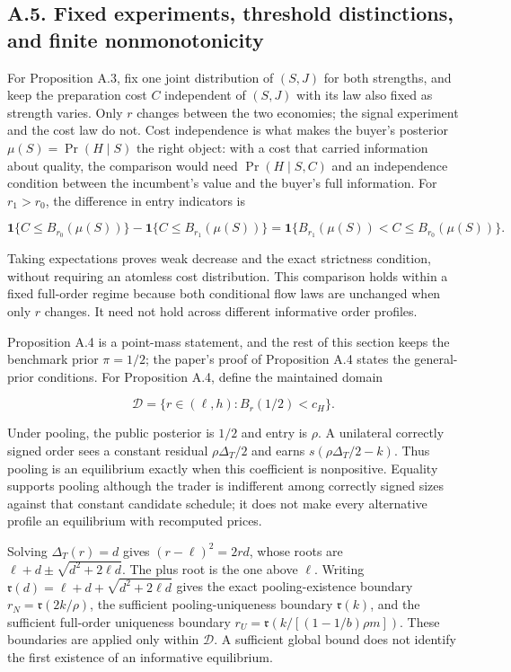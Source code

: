\documentclass[
  11pt,
]{article}
\begin{document}
\subsection{A.5. Fixed experiments, threshold distinctions, and finite
nonmonotonicity}\label{oa-a-thresholds}

For Proposition A.3, fix one joint distribution of \((S,J)\) for
both strengths, and keep the preparation cost \(C\) independent of
\((S,J)\) with its law also fixed as strength varies. Only \(r\)
changes between the two economies; the signal experiment and the cost
law do not. Cost independence is what makes the buyer's posterior
\(\mu(S)=\Pr(H\mid S)\) the right object: with a cost that carried
information about quality, the comparison would need \(\Pr(H\mid S,C)\)
and an independence condition between the incumbent's value and the
buyer's full information. For
\(r_1>r_0\), the difference in entry indicators is

\[
\mathbf1\{C\le B_{r_0}(\mu(S))\}
-\mathbf1\{C\le B_{r_1}(\mu(S))\}
=\mathbf1\{B_{r_1}(\mu(S))<C\le B_{r_0}(\mu(S))\}.
\tag{OA.18}\label{eq:oa-oa-18}
\]

Taking expectations proves weak decrease and the exact strictness
condition, without requiring an atomless cost distribution. This
comparison holds within a fixed full-order regime because both
conditional flow laws are unchanged when only \(r\) changes. It need not
hold across different informative order profiles.

Proposition A.4 is a point-mass statement, and the rest of this section
keeps the benchmark prior \(\pi=1/2\); the paper's proof of Proposition
A.4 states the general-prior conditions. For Proposition A.4, define the
maintained domain

\[
\mathcal D=\{r\in(\ell,h):B_r(1/2)<c_H\}.
\tag{OA.19}\label{eq:oa-oa-19}
\]

Under pooling, the public posterior is \(1/2\) and entry is \(\rho\). A
unilateral correctly signed order sees a constant residual
\(\rho\Delta_T/2\) and earns \(s(\rho\Delta_T/2-k)\). Thus pooling is an
equilibrium exactly when this coefficient is nonpositive. Equality
supports pooling although the trader is indifferent among correctly
signed sizes against that constant candidate schedule; it does not make
every alternative profile an equilibrium with recomputed prices.

Solving \(\Delta_T(r)=d\) gives \((r-\ell)^2=2rd\), whose roots are
\(\ell+d\pm\sqrt{d^2+2\ell d}\). The plus root is the one above
\(\ell\). Writing \(\mathfrak r(d)=\ell+d+\sqrt{d^2+2\ell d}\) gives the
exact pooling-existence boundary \(r_N=\mathfrak r(2k/\rho)\), the
sufficient pooling-uniqueness boundary \(\mathfrak r(k)\), and the
sufficient full-order uniqueness boundary
\(r_U=\mathfrak r(k/[(1-1/b)\rho m])\). These boundaries are applied
only within \(\mathcal D\). A sufficient global bound does not identify
the first existence of an informative equilibrium.
\end{document}
